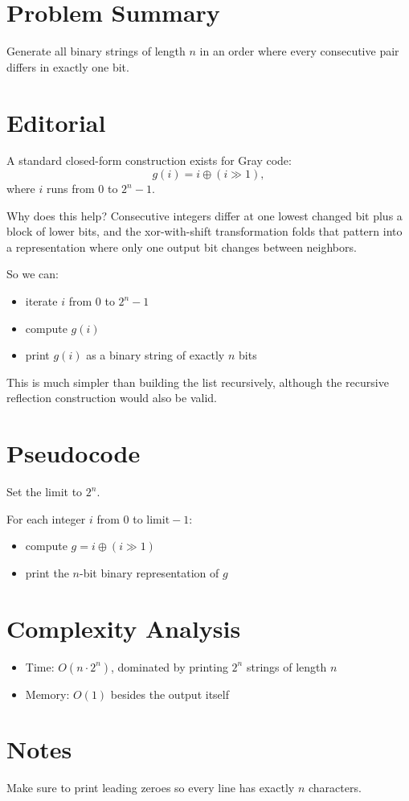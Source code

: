 \section{Problem Summary}
Generate all binary strings of length \(n\) in an order where every consecutive pair differs in exactly one bit.

\section{Editorial}
A standard closed-form construction exists for Gray code:
\[
g(i) = i \oplus (i \gg 1),
\]
where \(i\) runs from \(0\) to \(2^n - 1\).

Why does this help? Consecutive integers differ at one lowest changed bit plus a block of lower bits, and the xor-with-shift transformation folds that pattern into a representation where only one output bit changes between neighbors.

So we can:
\begin{itemize}
\item iterate \(i\) from \(0\) to \(2^n - 1\)
\item compute \(g(i)\)
\item print \(g(i)\) as a binary string of exactly \(n\) bits
\end{itemize}

This is much simpler than building the list recursively, although the recursive reflection construction would also be valid.

\section{Pseudocode}
Set the limit to \(2^n\).

For each integer \(i\) from \(0\) to \(\text{limit} - 1\):
\begin{itemize}
\item compute \(g = i \oplus (i \gg 1)\)
\item print the \(n\)-bit binary representation of \(g\)
\end{itemize}

\section{Complexity Analysis}
\begin{itemize}
\item Time: \(O(n \cdot 2^n)\), dominated by printing \(2^n\) strings of length \(n\)
\item Memory: \(O(1)\) besides the output itself
\end{itemize}

\section{Notes}
Make sure to print leading zeroes so every line has exactly \(n\) characters.
